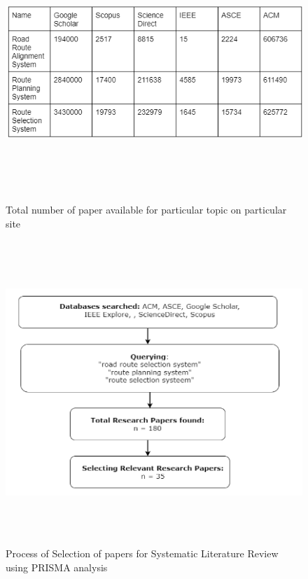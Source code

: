 \begin{figure}[H]
	\includegraphics[width=475pt,height=275pt]{record.png}
	\caption{Total number of paper available for particular topic on particular site}
\end{figure}
\begin{figure}[H]
	\includegraphics[width=475pt,height=325pt]{process.png}
	\caption{Process of Selection of papers for Systematic Literature Review using PRISMA analysis}
\end{figure}
